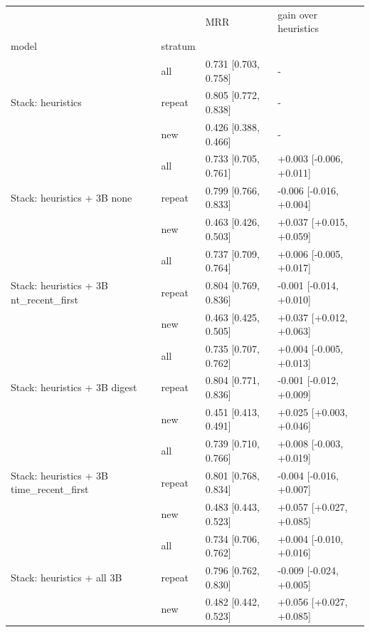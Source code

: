 \begin{tabular}{llll}
\toprule
 &  & MRR & gain over heuristics \\
model & stratum &  &  \\
\midrule
\multirow[t]{3}{*}{Stack: heuristics} & all & 0.731 [0.703, 0.758] & - \\
 & repeat & 0.805 [0.772, 0.838] & - \\
 & new & 0.426 [0.388, 0.466] & - \\
\cline{1-4}
\multirow[t]{3}{*}{Stack: heuristics + 3B none} & all & 0.733 [0.705, 0.761] & +0.003 [-0.006, +0.011] \\
 & repeat & 0.799 [0.766, 0.833] & -0.006 [-0.016, +0.004] \\
 & new & 0.463 [0.426, 0.503] & +0.037 [+0.015, +0.059] \\
\cline{1-4}
\multirow[t]{3}{*}{Stack: heuristics + 3B nt\_recent\_first} & all & 0.737 [0.709, 0.764] & +0.006 [-0.005, +0.017] \\
 & repeat & 0.804 [0.769, 0.836] & -0.001 [-0.014, +0.010] \\
 & new & 0.463 [0.425, 0.505] & +0.037 [+0.012, +0.063] \\
\cline{1-4}
\multirow[t]{3}{*}{Stack: heuristics + 3B digest} & all & 0.735 [0.707, 0.762] & +0.004 [-0.005, +0.013] \\
 & repeat & 0.804 [0.771, 0.836] & -0.001 [-0.012, +0.009] \\
 & new & 0.451 [0.413, 0.491] & +0.025 [+0.003, +0.046] \\
\cline{1-4}
\multirow[t]{3}{*}{Stack: heuristics + 3B time\_recent\_first} & all & 0.739 [0.710, 0.766] & +0.008 [-0.003, +0.019] \\
 & repeat & 0.801 [0.768, 0.834] & -0.004 [-0.016, +0.007] \\
 & new & 0.483 [0.443, 0.523] & +0.057 [+0.027, +0.085] \\
\cline{1-4}
\multirow[t]{3}{*}{Stack: heuristics + all 3B} & all & 0.734 [0.706, 0.762] & +0.004 [-0.010, +0.016] \\
 & repeat & 0.796 [0.762, 0.830] & -0.009 [-0.024, +0.005] \\
 & new & 0.482 [0.442, 0.523] & +0.056 [+0.027, +0.085] \\
\cline{1-4}
\bottomrule
\end{tabular}
